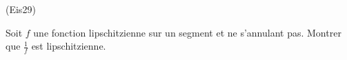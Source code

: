 \begin{tiny}(Eis29)\end{tiny}
Soit $f$ une fonction lipschitzienne sur un segment et ne s'annulant pas. Montrer que $\frac{1}{f}$ est lipschitzienne.